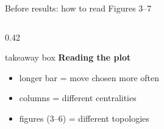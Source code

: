 \begin{frame}{Before results: how to read Figures 3--7}
\begin{columns}[T,onlytextwidth]
\begin{column}{0.42\textwidth}
\begin{beamercolorbox}[wd=\linewidth,rounded=true,sep=0.50em]{takeaway box}
        {\color{PresFourAccent}\bfseries Reading the plot}\par
        \begin{itemize}\setlength\itemsep{0.1em}
          \item longer bar = move chosen more often
          \item columns = different centralities
          \item figures (3--6) = different topologies
        \end{itemize}
      \end{beamercolorbox}
    \end{column}
  \end{columns}
\end{frame}
